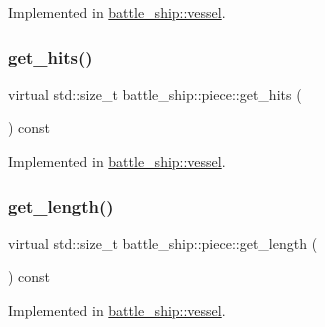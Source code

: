 Implemented in \hyperlink{classbattle__ship_1_1vessel_ab24ee1fe21632b510833c8369ef3560a}{battle\+\_\+ship\+::vessel}.

\mbox{\label{classbattle__ship_1_1piece_a27116e62c4ee91796349bbcb284e446d}} 
\subsubsection{\texorpdfstring{get\+\_\+hits()}{get\_hits()}}
{\footnotesize\ttfamily virtual std\+::size\+\_\+t battle\+\_\+ship\+::piece\+::get\+\_\+hits (\begin{DoxyParamCaption}{ }\end{DoxyParamCaption}) const\hspace{0.3cm}{\ttfamily [pure virtual]}}



Implemented in \hyperlink{classbattle__ship_1_1vessel_a1d7fb8fe8e4454850c1cd7dbb4c70d49}{battle\+\_\+ship\+::vessel}.

\mbox{\label{classbattle__ship_1_1piece_a08cfb1d99d1804f42f87878bef19e7ff}} 
\subsubsection{\texorpdfstring{get\+\_\+length()}{get\_length()}}
{\footnotesize\ttfamily virtual std\+::size\+\_\+t battle\+\_\+ship\+::piece\+::get\+\_\+length (\begin{DoxyParamCaption}{ }\end{DoxyParamCaption}) const\hspace{0.3cm}{\ttfamily [pure virtual]}}



Implemented in \hyperlink{classbattle__ship_1_1vessel_a96d84d8ad107db77ae601d4e29471dde}{battle\+\_\+ship\+::vessel}.

\mbox{\label{classbattle__ship_1_1piece_a95531d660360ffc403a742db1b4f6413}} 
